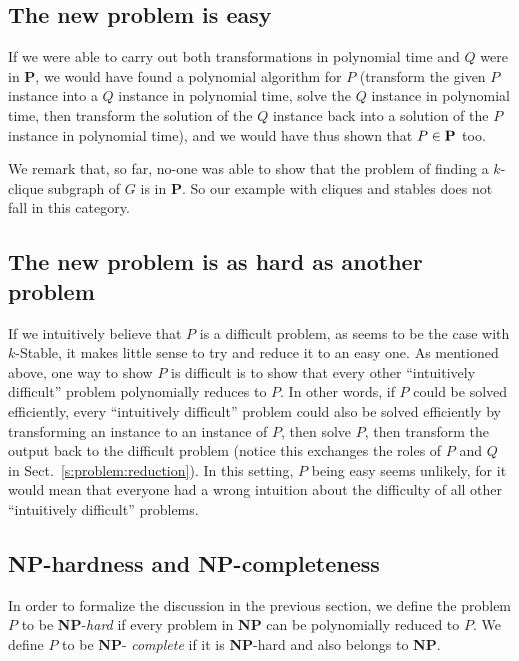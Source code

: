 \documentclass[a4paper]{book}
\theoremstyle{changebreak}                %
\begin{document}
\subsection{The new problem is easy}
If we were able to carry out both transformations in polynomial time
and $Q$ were in {\bf P}, we would have found a polynomial algorithm
for $P$ (transform the given $P$ instance into a $Q$ instance in
polynomial time, solve the $Q$ instance in polynomial time, then
transform the solution of the $Q$ instance back into a solution of the
$P$ instance in polynomial time), and we would have thus shown that
$P\in\mbox{\bf P}$ too.

We remark that, so far, no-one was able to show that the problem of
finding a $k$-clique subgraph of $G$ is in
{\bf P}. So our example with cliques and stables does not fall in this
category.

\subsection{The new problem is as hard as another problem}
If we intuitively believe that $P$ is a difficult problem, as seems to
be the case with {\sc $k$-Stable}, it makes little sense to try and
reduce it to an easy one. As mentioned above, one way to show $P$ is
difficult is to show that every other ``intuitively difficult''
problem polynomially reduces to $P$. In other words, if $P$ could be
solved efficiently, every ``intuitively difficult'' problem could also
be solved efficiently by transforming an instance to an instance of
$P$, then solve $P$, then transform the output back to the difficult
problem (notice this exchanges the roles of $P$ and $Q$ in
Sect.~\ref{s:problem:reduction}). In this setting, $P$ being easy
seems unlikely, for it would mean that everyone had a wrong intuition
about the difficulty of all other ``intuitively difficult'' problems.

\subsection{{\bf NP}-hardness and {\bf NP}-completeness}
In order to formalize the discussion in the previous section, we
define the problem $P$ to be {\bf NP}-{\it hard} if every problem in {\bf NP} can be polynomially reduced
to $P$. We define $P$ to be {\bf NP}-{\it
  complete} if it is {\bf
  NP}-hard and also belongs to {\bf NP}.
\end{document}
